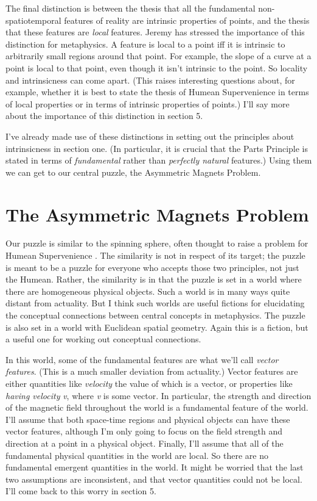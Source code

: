 The final distinction is between the thesis that all the fundamental non\hyp{}spatiotemporal features of reality are intrinsic properties of points, and the thesis that these features are \textit{local} features. Jeremy \citet{Butterfield2006} has stressed the importance of this distinction for metaphysics. A feature is local to a point iff it is intrinsic to arbitrarily small regions around that point. For example, the slope of a curve at a point is local to that point, even though it isn't intrinsic to the point. So locality and intrinsicness can come apart. (This raises interesting questions about, for example, whether it is best to state the thesis of Humean Supervenience in terms of local properties or in terms of intrinsic properties of points.) I'll say more about the importance of this distinction in section 5.

I've already made use of these distinctions in setting out the principles about intrinsicness in section one. (In particular, it is crucial that the Parts Principle is stated in terms of \textit{fundamental} rather than \textit{perfectly natural} features.) Using them we can get to our central puzzle, the Asymmetric Magnets Problem. 

\section{The Asymmetric Magnets Problem}

Our puzzle is similar to the spinning sphere, often thought to raise a problem for Humean Supervenience \citep{Armstrong1980}. The similarity is not in respect of its target; the puzzle is meant to be a puzzle for everyone who accepts those two principles, not just the Humean. Rather, the similarity is in that the puzzle is set in a world where there are homogeneous physical objects. Such a world is in many ways quite distant from actuality. But I think such worlds are useful fictions for elucidating the conceptual connections between central concepts in metaphysics. The puzzle is also set in a world with Euclidean spatial geometry. Again this is a fiction, but a useful one for working out conceptual connections.

In this world, some of the fundamental features are what we'll call \textit{vector features}. (This is a much smaller deviation from actuality.) Vector features are either quantities like \textit{velocity} the value of which is a vector, or properties like \textit{having velocity }\textit{v}, where \textit{v} is some vector. In particular, the strength and direction of the magnetic field throughout the world is a fundamental feature of the world. I'll assume that both space-time regions and physical objects can have these vector features, although I'm only going to focus on the field strength and direction at a point in a physical object. Finally, I'll assume that all of the fundamental physical quantities in the world are local. So there are no fundamental emergent quantities in the world. It might be worried that the last two assumptions are inconsistent, and that vector quantities could not be local. I'll come back to this worry in section 5.

